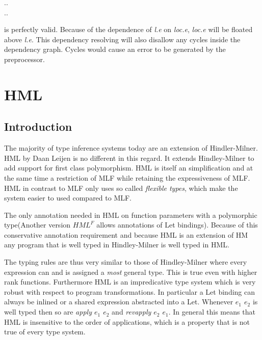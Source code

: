 \documentclass[twoside, titlepage, openright, a4paper]{book}
\newcommand{\Varid}[1]{\mathit{#1}}
\def\resethooks{%
  \global\let\SaveRestoreHook\empty
  \global\let\ColumnHook\empty}
\let\hspre\empty
\let\hspost\empty
\begin{document}
\begin{hscode}\SaveRestoreHook
\column{B}{@{}>{\hspre}l<{\hspost}@{}}%
\column{E}{@{}>{\hspre}l<{\hspost}@{}}%
\>[B]{}\Varid{l}\mbox{.}\Varid{e}\mathrel{=}\mbox{.}\Varid{e}{}\<[E]%
\\
\>[B]{}\mbox{.}\Varid{e}\mathrel{=}\Varid{m}\mbox{.}\Varid{l}{}\<[E]%
\ColumnHook
\end{hscode}\resethooks

is perfectly valid. Because of the dependence of \emph{l.e} on \emph{loc.e}, \emph{loc.e} will be floated above \emph{l.e}. This dependency resolving will also disallow any cycles inside the dependency graph. Cycles would cause an error to be generated by the preprocessor.


\chapter{HML}
\label{HML}
\section{Introduction}
The majority of type inference systems today are an extension of Hindler-Milner\cite{HM}. HML\cite{HML} by Daan Leijen is no different in this regard. It extends Hindley-Milner to add support for first class polymorphism. HML is itself an simplification and at the same time a restriction of MLF\cite{MLF} while retaining the expressiveness of MLF. HML in contrast to MLF only uses so called \emph{flexible types}, which make the system easier to used compared to MLF.

The only annotation needed in HML on function parameters with a polymorphic type(Another version $HML^F$ allows annotations of Let bindings). Because of this conservative annotation requirement and because HML is an extension of HM any program that is well typed in Hindley-Milner is well typed in HML.

The typing rules are thus very similar to those of Hindley-Milner where every expression can and is assigned a \emph{most} general type. This is true even with higher rank functions. Furthermore HML is an impredicative type system which is very robust with respect to program transformations. In particular a Let binding can always be inlined or a shared expression abstracted into a Let. Whenever \emph{$e_1$ $e_2$} is well typed then so are \emph{apply $e_1$ $e_2$} and \emph{revapply $e_2$ $e_1$}. In general this means that HML is insensitive to the order of applications, which is a property that is not true of every type system.
\end{document}
